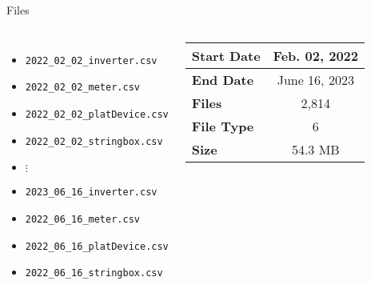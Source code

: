  \begin{frame}{Files}
      \begin{columns}
          \begin{itemize}
              \item[] \footnotesize {} \texttt{2022\_02\_02\_inverter.csv}
              \item[]  \footnotesize \texttt{2022\_02\_02\_meter.csv}
              \item[]  \footnotesize \texttt{2022\_02\_02\_platDevice.csv}
              \item[]  \footnotesize \texttt{2022\_02\_02\_stringbox.csv}
              \item[] \begin{center}
                   $\vdots$
              \end{center}
              \item[]  \footnotesize \texttt{2023\_06\_16\_inverter.csv}
              \item[]  \footnotesize \texttt{2022\_06\_16\_meter.csv}
              \item[]  \footnotesize \texttt{2022\_06\_16\_platDevice.csv}
              \item[]  \footnotesize \texttt{2022\_06\_16\_stringbox.csv}
          \end{itemize}
          \begin{table}[]
              \centering
              \begin{tabular}{l|c}
                   \textbf{Start Date} & Feb. 02, 2022\\
                   \hline
                  \textbf{End Date} & June 16, 2023\\
                   \hline
                   \textbf{Files} & 2,814\\
                   \hline
                   \textbf{File Type} & 6\\
                   \hline
                   \textbf{Size} & 54.3 MB
              \end{tabular}
          \end{table}
          
      \end{columns}
  \end{frame}